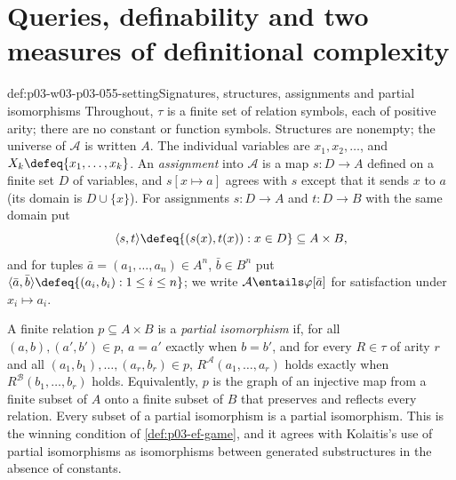 \section{Queries, definability and two measures of definitional complexity}
\label{sec:p03-w03-p03-055-measures}

\begin{hbconvention}{def:p03-w03-p03-055-setting}{Signatures, structures, assignments and partial isomorphisms}
Throughout, \(\tau\) is a finite set of relation symbols, each of positive
arity; there are no constant or function symbols. Structures are nonempty;
the universe of \(\mathcal A\) is written \(A\). The individual variables
are \(x_1,x_2,\ldots\), and \(X_k\defeq\{x_1,\ldots,x_k\}\). An
\emph{assignment} into \(\mathcal A\) is a map \(s\colon D\to A\) defined
on a finite set \(D\) of variables, and \(s[x\mapsto a]\) agrees with
\(s\) except that it sends \(x\) to \(a\) (its domain is
\(D\cup\{x\}\)). For assignments \(s\colon D\to A\) and
\(t\colon D\to B\) with the same domain put
\[
 \langle s,t\rangle\defeq\{(s(x),t(x)):x\in D\}\subseteq A\times B,
\]
and for tuples \(\bar a=(a_1,\ldots,a_n)\in A^n\),
\(\bar b\in B^n\) put \(\langle\bar a,\bar b\rangle\defeq
\{(a_i,b_i):1\le i\le n\}\); we write \(\mathcal A\entails\varphi[\bar a]\)
for satisfaction under \(x_i\mapsto a_i\).

A finite relation \(p\subseteq A\times B\) is a \emph{partial
isomorphism} if, for all \((a,b),(a',b')\in p\), \(a=a'\) exactly when
\(b=b'\), and for every \(R\in\tau\) of arity \(r\) and all
\((a_1,b_1),\ldots,(a_r,b_r)\in p\),
\(R^{\mathcal A}(a_1,\ldots,a_r)\) holds exactly when
\(R^{\mathcal B}(b_1,\ldots,b_r)\) holds. Equivalently, \(p\) is the graph
of an injective map from a finite subset of \(A\) onto a finite subset of
\(B\) that preserves and reflects every relation. Every subset of a partial
isomorphism is a partial isomorphism. This is the winning condition of
\cref{def:p03-ef-game}, and it agrees with Kolaitis's use of partial
isomorphisms as isomorphisms between generated substructures
\cite[p.~4 and Def.~3.1, p.~9]{Kolaitis2003ExpressivePowerNotes} in the
absence of constants.
\end{hbconvention}


